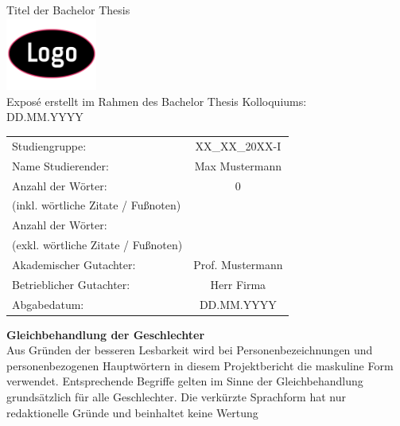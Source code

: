 \documentclass[a4paper,12pt]{scrartcl}
\author{Anisa Mecheraoui}
\newcommand{\myLarge}[1]{{\fontsize{20pt}{24pt}\selectfont\color{ba-blau}#1}}
\newcommand{\pageTitel}[1]{{\fontsize{14pt}{17pt}\selectfont\textbf{\color{ba-blau}#1}}}
\begin{document}
\thispagestyle{Deckblatt}

\begin{center}
    \myLarge {Titel der Bachelor Thesis} \\[3ex]
    \includegraphics[width=3cm]{Platzhalter_logo.png} \\[3ex]
    \large{Exposé erstellt im Rahmen des Bachelor Thesis Kolloquiums:
} \\
    \large{DD.MM.YYYY}
\end{center}

\renewcommand{\arraystretch}{2.5}
\begin{table}[h]
    \centering
    \begin{tabularx}{\textwidth}{l c}
        Studiengruppe: &  XX\_XX\_20XX-I \\
        Name Studierender: & Max Mustermann\\
        Anzahl der Wörter: & 0\\
        (inkl. wörtliche Zitate / Fußnoten) & ~ \\
        Anzahl der Wörter: & \\
        (exkl. wörtliche Zitate / Fußnoten) & ~ \\
        Akademischer Gutachter: & Prof. Mustermann\\
        Betrieblicher Gutachter: & Herr Firma\\
        Abgabedatum: & DD.MM.YYYY\\
    \end{tabularx}
\end{table}

\newpage

\pagestyle{style1}

\setcounter{page}{1}
\pageTitel{Gleichbehandlung der Geschlechter}\\
Aus Gründen der besseren Lesbarkeit wird bei Personenbezeichnungen und personenbezogenen Hauptwörtern in diesem Projektbericht die maskuline Form verwendet. Entsprechende Begriffe gelten im Sinne der Gleichbehandlung grundsätzlich für alle Geschlechter. Die verkürzte Sprachform hat nur redaktionelle Gründe und beinhaltet keine Wertung
\newpage
\tableofcontents
\newpage
\listoffigures
\newpage
\listoftables
\newpage
\end{document}

